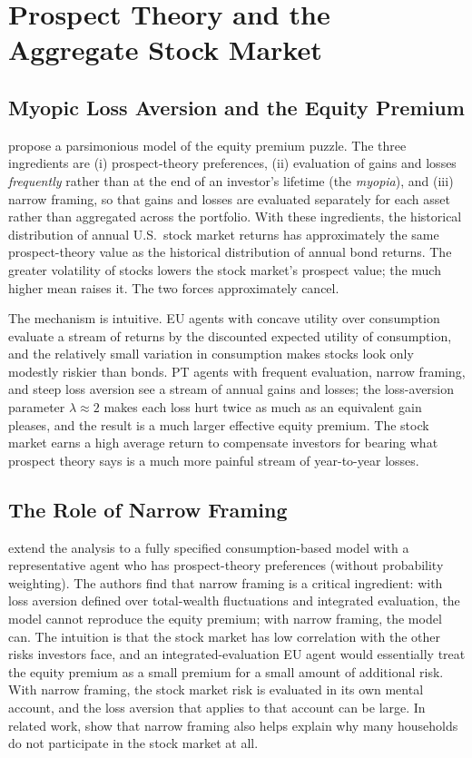 \section{Prospect Theory and the Aggregate Stock Market}
\label{sec:ptaggregate}

\subsection{Myopic Loss Aversion and the Equity Premium}

\citet{benartzi1995} propose a parsimonious model of the equity premium puzzle. The three ingredients are (i) prospect-theory preferences, (ii) evaluation of gains and losses \emph{frequently} rather than at the end of an investor's lifetime (the \emph{myopia}), and (iii) narrow framing, so that gains and losses are evaluated separately for each asset rather than aggregated across the portfolio. With these ingredients, the historical distribution of annual U.S.\ stock market returns has approximately the same prospect-theory value as the historical distribution of annual bond returns. The greater volatility of stocks lowers the stock market's prospect value; the much higher mean raises it. The two forces approximately cancel.

The mechanism is intuitive. EU agents with concave utility over consumption evaluate a stream of returns by the discounted expected utility of consumption, and the relatively small variation in consumption makes stocks look only modestly riskier than bonds. PT agents with frequent evaluation, narrow framing, and steep loss aversion see a stream of annual gains and losses; the loss-aversion parameter $\lambda \approx 2$ makes each loss hurt twice as much as an equivalent gain pleases, and the result is a much larger effective equity premium. The stock market earns a high average return to compensate investors for bearing what prospect theory says is a much more painful stream of year-to-year losses.

\subsection{The Role of Narrow Framing}

\citet{barberis2001} extend the analysis to a fully specified consumption-based model with a representative agent who has prospect-theory preferences (without probability weighting). The authors find that narrow framing is a critical ingredient: with loss aversion defined over total-wealth fluctuations and integrated evaluation, the model cannot reproduce the equity premium; with narrow framing, the model can. The intuition is that the stock market has low correlation with the other risks investors face, and an integrated-evaluation EU agent would essentially treat the equity premium as a small premium for a small amount of additional risk. With narrow framing, the stock market risk is evaluated in its own mental account, and the loss aversion that applies to that account can be large. In related work, \citet{barberishuangthaler2006} show that narrow framing also helps explain why many households do not participate in the stock market at all.

